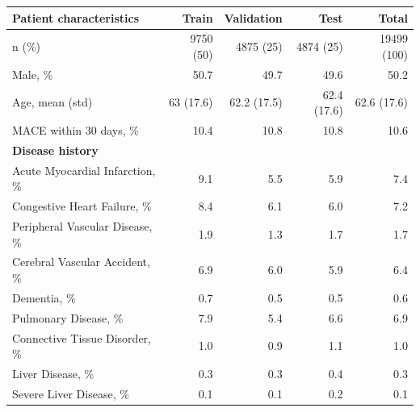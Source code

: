 \documentclass[preprint]{elsarticle}
\begin{document}
\renewcommand{\arraystretch}{1.2}
\begin{table}
  \centering
  \begin{footnotesize}
\begin{tabular}{@{}lrrrr@{}}
  \toprule
  \textbf{Patient characteristics} & \textbf{Train} & \textbf{Validation} & \textbf{Test} & \textbf{Total} \\
  \midrule
n (\%)                                           & 9750 (50)      & 4875 (25)           & 4874 (25)     & 19499 (100)    \\
Male, \%                                         & 50.7           & 49.7                & 49.6          & 50.2           \\
Age, mean (std)                                  & 63 (17.6)      & 62.2 (17.5)         & 62.4 (17.6)   & 62.6 (17.6)    \\
MACE within 30 days, \%                          & 10.4           & 10.8                & 10.8          & 10.6           \\
\midrule
\textbf{Disease history} & & & & \\
\midrule
Acute Myocardial Infarction, \%                  & 9.1            & 5.5                 & 5.9           & 7.4            \\
Congestive Heart Failure, \%                     & 8.4            & 6.1                 & 6.0           & 7.2            \\
Peripheral Vascular Disease, \%                  & 1.9            & 1.3                 & 1.7           & 1.7            \\
Cerebral Vascular Accident, \%                   & 6.9            & 6.0                 & 5.9           & 6.4            \\
Dementia, \%                                     & 0.7            & 0.5                 & 0.5           & 0.6            \\
Pulmonary Disease, \%                            & 7.9            & 5.4                 & 6.6           & 6.9            \\
Connective Tissue Disorder, \%                   & 1.0            & 0.9                 & 1.1           & 1.0            \\
Liver Disease, \%                                & 0.3            & 0.3                 & 0.4           & 0.3            \\
Severe Liver Disease, \%                         & 0.1            & 0.1                 & 0.2           & 0.1            \\

\end{tabular}
\end{footnotesize}
\end{table}
\end{document}
